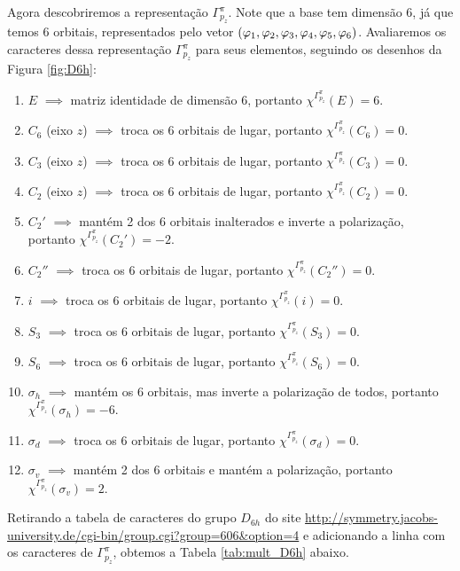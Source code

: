 \documentclass[a4paper,10pt]{article}
\newcommand{\mchi}{\chi^{\Gamma^\pi_{p_z}}}
\begin{document}
Agora descobriremos a representação $\Gamma^\pi_{p_z}$. Note que a base tem dimensão $6$, já que temos 6 orbitais, representados pelo vetor $(\varphi_1, \varphi_2, \varphi_3, \varphi_4, \varphi_5, \varphi_6)$. Avaliaremos os caracteres dessa representação $\Gamma^\pi_{p_z}$ para seus elementos, seguindo os desenhos da Figura \ref{fig:D6h}:
\begin{enumerate}
\item $E$ $\implies$ matriz identidade de dimensão 6, portanto $\mchi(E) = 6$.
\item $C_6$ (eixo $z$) $\implies$ troca os 6 orbitais de lugar, portanto $\mchi(C_6) = 0$.
\item $C_3$ (eixo $z$) $\implies$ troca os 6 orbitais de lugar, portanto $\mchi(C_3) = 0$.
\item $C_2$ (eixo $z$) $\implies$ troca os 6 orbitais de lugar, portanto $\mchi(C_2) = 0$.
\item $C_2'$ $\implies$ mantém 2 dos 6 orbitais inalterados e inverte a polarização, portanto $\mchi(C_2') = -2$.
\item $C_2''$ $\implies$ troca os 6 orbitais de lugar, portanto $\mchi(C_2'') = 0$.
\item $i$ $\implies$ troca os 6 orbitais de lugar, portanto $\mchi(i) = 0$.
\item $S_3$ $\implies$ troca os 6 orbitais de lugar, portanto $\mchi(S_3) = 0$.
\item $S_6$ $\implies$ troca os 6 orbitais de lugar, portanto $\mchi(S_6) = 0$.
\item $\sigma_h$ $\implies$ mantém os 6 orbitais, mas inverte a polarização de todos, portanto $\mchi(\sigma_h) = -6$.
\item $\sigma_d$ $\implies$ troca os 6 orbitais de lugar, portanto $\mchi(\sigma_d) = 0$.
\item $\sigma_v$ $\implies$ mantém 2 dos 6 orbitais e mantém a polarização, portanto $\mchi(\sigma_v) = 2$.
\end{enumerate}

Retirando a tabela de caracteres do grupo $D_{6h}$ do site \url{http://symmetry.jacobs-university.de/cgi-bin/group.cgi?group=606&option=4} e adicionando a linha com os caracteres de $\Gamma^\pi_{p_z}$, obtemos a Tabela \ref{tab:mult_D6h} abaixo.
\end{document}
